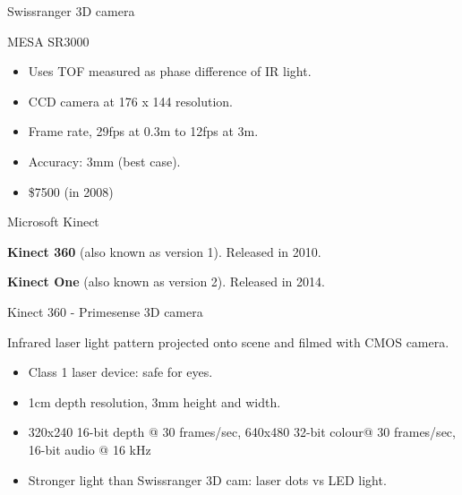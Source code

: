 \documentclass[compress]{beamer}
\begin{document}
\begin{frame}{Swissranger 3D camera}

    MESA SR3000

    \begin{itemize}

        \item
              Uses TOF measured as phase difference of IR light.
        \item
              CCD camera at 176 x 144 resolution.
        \item
              Frame rate, 29fps at 0.3m to 12fps at 3m.
        \item
              Accuracy: 3mm (best case).
        \item
              \$7500 (in 2008)
    \end{itemize}

\end{frame}

\begin{frame}{Microsoft Kinect}

    \textbf{Kinect 360} (also known as version 1). Released in 2010.

    \textbf{Kinect One} (also known as version 2). Released in 2014.

\end{frame}

\begin{frame}{Kinect 360 - Primesense 3D camera}

    Infrared laser light pattern projected onto scene and filmed with CMOS
    camera.

    \begin{itemize}

        \item
              Class 1 laser device: safe for eyes.
        \item
              1cm depth resolution, 3mm height and width.
        \item
              320x240 16-bit depth @ 30 frames/sec, 640x480 32-bit colour@ 30
              frames/sec, 16-bit audio @ 16 kHz
        \item
              Stronger light than Swissranger 3D cam: laser dots vs LED light.
    \end{itemize}

\end{frame}
\end{document}
